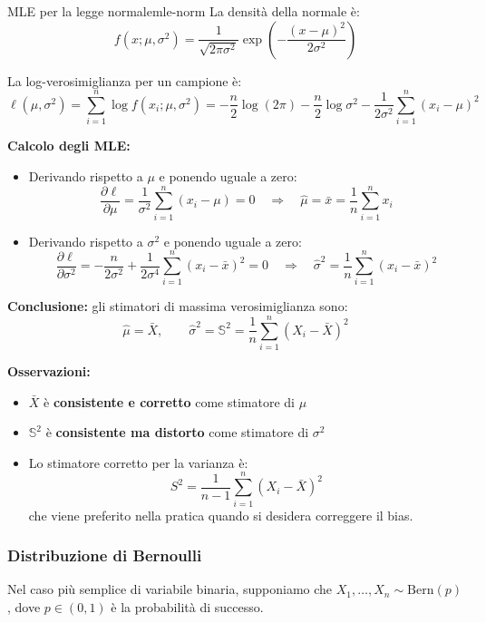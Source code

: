 \begin{esempio}{MLE per la legge normale}{mle-norm}
La densità della normale è:
\[
f(x; \mu, \sigma^2) = \frac{1}{\sqrt{2\pi \sigma^2}} \exp\left( -\frac{(x - \mu)^2}{2\sigma^2} \right)
\]

La log-verosimiglianza per un campione è:
\[
\ell(\mu, \sigma^2) = \sum_{i=1}^n \log f(x_i; \mu, \sigma^2) =
- \frac{n}{2} \log(2\pi) - \frac{n}{2} \log \sigma^2 - \frac{1}{2\sigma^2} \sum_{i=1}^n (x_i - \mu)^2
\]

\medskip
\textbf{Calcolo degli MLE:}
\begin{itemize}
  \item Derivando rispetto a \( \mu \) e ponendo uguale a zero:
  \[
  \frac{\partial \ell}{\partial \mu} = \frac{1}{\sigma^2} \sum_{i=1}^n (x_i - \mu) = 0
  \quad \Rightarrow \quad
  \hat{\mu} = \bar{x} = \frac{1}{n} \sum_{i=1}^n x_i
  \]

  \item Derivando rispetto a \( \sigma^2 \) e ponendo uguale a zero:
  \[
  \frac{\partial \ell}{\partial \sigma^2} = -\frac{n}{2\sigma^2} + \frac{1}{2\sigma^4} \sum_{i=1}^n (x_i - \bar{x})^2 = 0
  \quad \Rightarrow \quad
  \hat{\sigma}^2 = \frac{1}{n} \sum_{i=1}^n (x_i - \bar{x})^2
  \]
\end{itemize}

\medskip
\textbf{Conclusione:} gli stimatori di massima verosimiglianza sono:
\[
\hat{\mu} = \bar{X}, \qquad \hat{\sigma}^2 = \mathbb{S}^2 = \frac{1}{n} \sum_{i=1}^n (X_i - \bar{X})^2
\]

\medskip
\textbf{Osservazioni:}
\begin{itemize}
  \item \( \bar{X} \) è \textbf{consistente e corretto} come stimatore di \( \mu \)
  \item \( \mathbb{S}^2 \) è \textbf{consistente ma distorto} come stimatore di \( \sigma^2 \)
  \item Lo stimatore corretto per la varianza è:
  \[
  S^2 = \frac{1}{n-1} \sum_{i=1}^n (X_i - \bar{X})^2
  \]
  che viene preferito nella pratica quando si desidera correggere il bias.
\end{itemize}
\end{esempio}


\subsubsection{Distribuzione di Bernoulli}

Nel caso più semplice di variabile binaria, supponiamo che \( X_1, \dots, X_n \sim \mathrm{Bern}(p) \), dove \( p \in (0,1) \) è la probabilità di successo.

